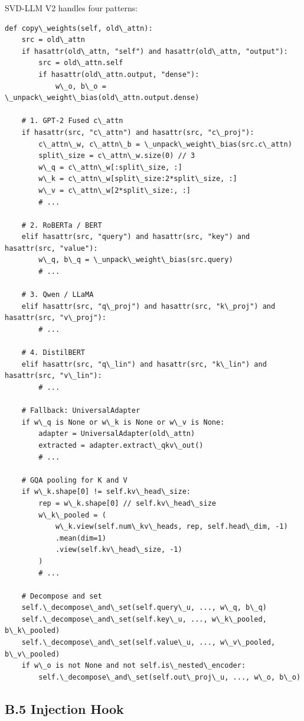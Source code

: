 SVD-LLM V2 handles four patterns:

\begin{lstlisting}
def copy\_weights(self, old\_attn):
    src = old\_attn
    if hasattr(old\_attn, "self") and hasattr(old\_attn, "output"):
        src = old\_attn.self
        if hasattr(old\_attn.output, "dense"):
            w\_o, b\_o = \_unpack\_weight\_bias(old\_attn.output.dense)
    
    # 1. GPT-2 Fused c\_attn
    if hasattr(src, "c\_attn") and hasattr(src, "c\_proj"):
        c\_attn\_w, c\_attn\_b = \_unpack\_weight\_bias(src.c\_attn)
        split\_size = c\_attn\_w.size(0) // 3
        w\_q = c\_attn\_w[:split\_size, :]
        w\_k = c\_attn\_w[split\_size:2*split\_size, :]
        w\_v = c\_attn\_w[2*split\_size:, :]
        # ...
    
    # 2. RoBERTa / BERT
    elif hasattr(src, "query") and hasattr(src, "key") and hasattr(src, "value"):
        w\_q, b\_q = \_unpack\_weight\_bias(src.query)
        # ...
    
    # 3. Qwen / LLaMA
    elif hasattr(src, "q\_proj") and hasattr(src, "k\_proj") and hasattr(src, "v\_proj"):
        # ...
    
    # 4. DistilBERT
    elif hasattr(src, "q\_lin") and hasattr(src, "k\_lin") and hasattr(src, "v\_lin"):
        # ...
    
    # Fallback: UniversalAdapter
    if w\_q is None or w\_k is None or w\_v is None:
        adapter = UniversalAdapter(old\_attn)
        extracted = adapter.extract\_qkv\_out()
        # ...
    
    # GQA pooling for K and V
    if w\_k.shape[0] != self.kv\_head\_size:
        rep = w\_k.shape[0] // self.kv\_head\_size
        w\_k\_pooled = (
            w\_k.view(self.num\_kv\_heads, rep, self.head\_dim, -1)
            .mean(dim=1)
            .view(self.kv\_head\_size, -1)
        )
        # ...
    
    # Decompose and set
    self.\_decompose\_and\_set(self.query\_u, ..., w\_q, b\_q)
    self.\_decompose\_and\_set(self.key\_u, ..., w\_k\_pooled, b\_k\_pooled)
    self.\_decompose\_and\_set(self.value\_u, ..., w\_v\_pooled, b\_v\_pooled)
    if w\_o is not None and not self.is\_nested\_encoder:
        self.\_decompose\_and\_set(self.out\_proj\_u, ..., w\_o, b\_o)
\end{lstlisting}

\subsection{B.5 Injection Hook}

